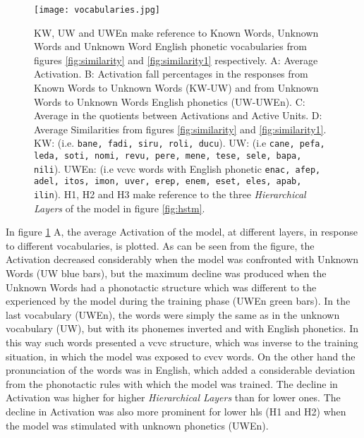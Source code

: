 \documentclass[11pt,a4paper]{article}
\begin{document}
\begin{figure}[h]
\centering
\texttt{[image: vocabularies.jpg]}
\caption{\scriptsize{KW, UW and UWEn make reference to Known Words, Unknown Words and
Unknown Word English phonetic vocabularies from figures \ref{fig:similarity} and \ref{fig:similarity1}
respectively.
A: Average Activation.
B: Activation fall percentages in the responses from Known Words to Unknown Words (KW-UW)
and from Unknown Words to Unknown Words English phonetics (UW-UWEn).
C: Average in the quotients between Activations and Active Units.
D: Average Similarities from figures \ref{fig:similarity} and \ref{fig:similarity1}.
KW: (i.e. \texttt{bane, fadi, siru, roli, ducu}).
UW: (i.e \texttt{cane, pefa, leda, soti, nomi, revu, pere, mene, tese, sele, bapa, nili}).
UWEn: (i.e \ac{vcvc} words with English phonetic \texttt{enac, afep, adel, itos, imon, uver, erep, enem, eset, eles, apab, ilin}).
H1, H2 and H3 make reference to the three \textit{Hierarchical Layers} of the model in figure \ref{fig:hstm}.}}
\label{fig:vocabularies}
\end{figure}

In figure \ref{fig:vocabularies} A, the average Activation of the model, at different layers, in response to
different vocabularies, is plotted.
As can be seen from the figure, the Activation decreased considerably when the model was confronted
with Unknown Words (UW blue bars), but the maximum decline was produced when the Unknown Words had
a phonotactic structure which was different to the experienced by the model during the training phase
(UWEn green bars).
In the last vocabulary (UWEn), the words were simply the same as in the unknown vocabulary (UW),
but with its phonemes inverted and with English phonetics.
In this way such words presented a \ac{vcvc} structure, which was inverse to the training situation,
in which the model was exposed to \ac{cvcv} words.
On the other hand the pronunciation of the words was in English, which added a considerable deviation
from the phonotactic rules with which the model was trained.
The decline in Activation was higher for higher \textit{Hierarchical Layers} than for lower ones.
The decline in Activation was also more prominent for lower \ac{hl}s (H1 and H2)
when the model was stimulated with unknown phonetics (UWEn).\\
\end{document}
